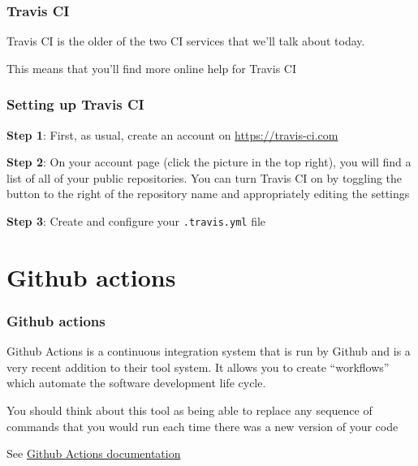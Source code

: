 \documentclass[10pt]{beamer}
\begin{document}
  \begin{frame} \frametitle{Travis CI}

    Travis CI is the older of the two CI services that we'll talk about today.

    \vspace{0.25cm}

    This means that you'll find more online help for Travis CI

  \end{frame}

  \begin{frame} \frametitle{Setting up Travis CI}

    \textbf{Step 1}: First, as usual, create an account on \url{https://travis-ci.com}

    \vspace{0.25cm}

    \textbf{Step 2}: On your account page (click the picture in the top right), you will
    find a list of all of your public repositories. You can turn Travis CI on by
    toggling the button to the right of the repository name and appropriately editing
    the settings

    \vspace{0.25cm}

    \textbf{Step 3}: Create and configure your \texttt{.travis.yml} file

  \end{frame}


\section{Github actions}

  \begin{frame} \frametitle{Github actions}

    Github Actions is a continuous integration system that is run by Github and is a
    very recent addition to their tool system. It allows you to create ``workflows''
    which automate the software development life cycle.

    \vspace{0.25cm}

    You should think about this tool as being able to replace any sequence of
    commands that you would run each time there was a new version of your code

    \vspace{0.25cm}

    See \href{https://help.github.com/en/actions}{Github Actions documentation}

  \end{frame}
\end{document}
